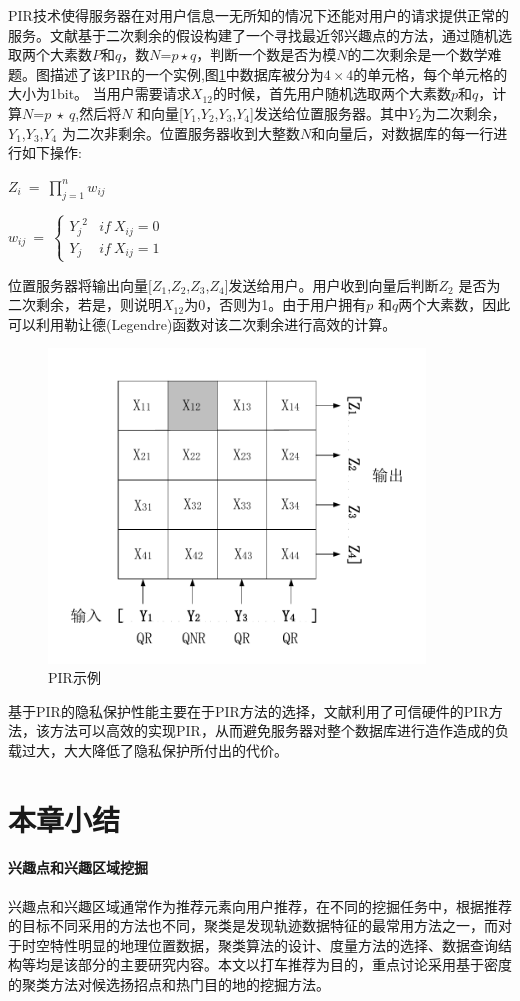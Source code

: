 PIR技术使得服务器在对用户信息一无所知的情况下还能对用户的请求提供正常的服务。文献\cite{ghinita2008private}基于二次剩余的假设\cite{kushilevitz1997replication}构建了一个寻找最近邻兴趣点的方法，通过随机选取两个大素数$P$和$q$，数$N$=$p\star q$，判断一个数是否为模$N$的二次剩余是一个数学难题。图描述了该PIR的一个实例,图\ref{fig:PIR_pdf}中数据库被分为$4\times 4$的单元格，每个单元格的大小为1bit。 当用户需要请求$X_{12}$的时候，首先用户随机选取两个大素数$p$和$q$，计算$N$=$p ~\star ~q$,然后将$N$ 和向量[$Y_1$,$Y_2$,$Y_3$,$Y_4$]发送给位置服务器。其中$Y_2$为二次剩余，$Y_1$,$Y_3$,$Y_4$ 为二次非剩余。位置服务器收到大整数$N$和向量后，对数据库的每一行进行如下操作:
\begin{center}
$Z_i~=~ \prod_{j=1}^{n} w_{ij}$


$w_{ij}~=~
\left\{\begin{matrix}
 {Y_j}^2& if~X_{ij}=0\\
 {Y_j}& if~X_{ij}=1
\end{matrix}\right.
$
\end{center}
位置服务器将输出向量[$Z_1$,$Z_2$,$Z_3$,$Z_4$]发送给用户。用户收到向量后判断$Z_2$ 是否为二次剩余，若是，则说明$X_{12}$为0，否则为1。由于用户拥有$p$ 和$q$两个大素数，因此可以利用勒让德(Legendre)函数\cite{flath1989introduction}对该二次剩余进行高效的计算。
\begin{figure}[H]
\centering
\includegraphics[width=10cm]{fig/PIR.pdf}
\caption{PIR示例} %
\label{fig:PIR_pdf}
\end{figure}

基于PIR的隐私保护性能主要在于PIR方法的选择，文献\cite{khoshgozaran2011location}利用了可信硬件的PIR方法，该方法可以高效的实现PIR，从而避免服务器对整个数据库进行造作造成的负载过大，大大降低了隐私保护所付出的代价。

\section{本章小结}
\paragraph{兴趣点和兴趣区域挖掘}

兴趣点和兴趣区域通常作为推荐元素向用户推荐，在不同的挖掘任务中，根据推荐的目标不同采用的方法也不同，聚类是发现轨迹数据特征的最常用方法之一，而对于时空特性明显的地理位置数据，聚类算法的设计、度量方法的选择、数据查询结构等均是该部分的主要研究内容。本文以打车推荐为目的，重点讨论采用基于密度的聚类方法对候选扬招点和热门目的地的挖掘方法。


